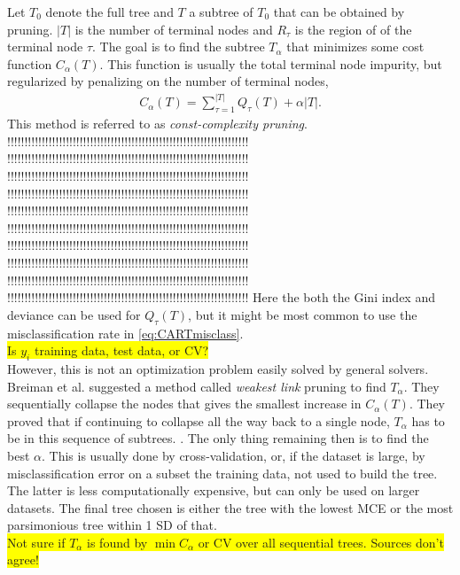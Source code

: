 Let $T_0$ denote the full tree and $T$ a subtree of $T_0$ that can be obtained by pruning. $|T|$ is the number of terminal nodes and $R_{\tau}$ is the region of of the terminal node $\tau$. The goal is to find the subtree $T_\alpha$ that minimizes some cost function $C_\alpha (T)$. This function is usually the total terminal node impurity, but regularized by penalizing on the number of terminal nodes,
\begin{align}
  \label{eq:CostPruning} 
  C_\alpha (T) = \sum_{\tau = 1}^{|T|} Q_\tau (T) + \alpha |T|. 
\end{align}
This method is referred to as \textit{const-complexity pruning}.
!!!!!!!!!!!!!!!!!!!!!!!!!!!!!!!!!!!!!!!!!!!!!!!!!!!!!!!!!!!!!!!!!!!!!!
!!!!!!!!!!!!!!!!!!!!!!!!!!!!!!!!!!!!!!!!!!!!!!!!!!!!!!!!!!!!!!!!!!!!!!
!!!!!!!!!!!!!!!!!!!!!!!!!!!!!!!!!!!!!!!!!!!!!!!!!!!!!!!!!!!!!!!!!!!!!!
!!!!!!!!!!!!!!!!!!!!!!!!!!!!!!!!!!!!!!!!!!!!!!!!!!!!!!!!!!!!!!!!!!!!!!
!!!!!!!!!!!!!!!!!!!!!!!!!!!!!!!!!!!!!!!!!!!!!!!!!!!!!!!!!!!!!!!!!!!!!!
!!!!!!!!!!!!!!!!!!!!!!!!!!!!!!!!!!!!!!!!!!!!!!!!!!!!!!!!!!!!!!!!!!!!!!
!!!!!!!!!!!!!!!!!!!!!!!!!!!!!!!!!!!!!!!!!!!!!!!!!!!!!!!!!!!!!!!!!!!!!!
!!!!!!!!!!!!!!!!!!!!!!!!!!!!!!!!!!!!!!!!!!!!!!!!!!!!!!!!!!!!!!!!!!!!!!
!!!!!!!!!!!!!!!!!!!!!!!!!!!!!!!!!!!!!!!!!!!!!!!!!!!!!!!!!!!!!!!!!!!!!!
!!!!!!!!!!!!!!!!!!!!!!!!!!!!!!!!!!!!!!!!!!!!!!!!!!!!!!!!!!!!!!!!!!!!!!
Here the both the Gini index and deviance can be used for $Q_\tau (T)$, but it might be most common to use the misclassification rate in \eqref{eq:CARTmisclass}. 
\\ \colorbox{yellow}{Is $y_i$ training data, test data, or CV?} \\
However, this is not an optimization problem easily solved by general solvers. Breiman et al. \cite{breiman} suggested a method called \textit{weakest link} pruning to find $T_\alpha$. They sequentially collapse the nodes that gives the smallest increase in $C_\alpha(T)$.
They proved that if continuing to collapse all the way back to a single node, $T_\alpha$ has to be in this sequence of subtrees.  . The only thing remaining then is to find the best $\alpha$. This is usually done by cross-validation, or, if the dataset is large, by misclassification error on a subset the training data, not used to build the tree. The latter is less computationally expensive, but can only be used on larger datasets. The final tree chosen is either the tree with the lowest MCE or the most parsimonious tree within 1 SD of that.
\\ \colorbox{yellow}{Not sure if $T_\alpha$ is found by $\min C_\alpha$ or CV over all sequential trees. Sources don't agree!}
